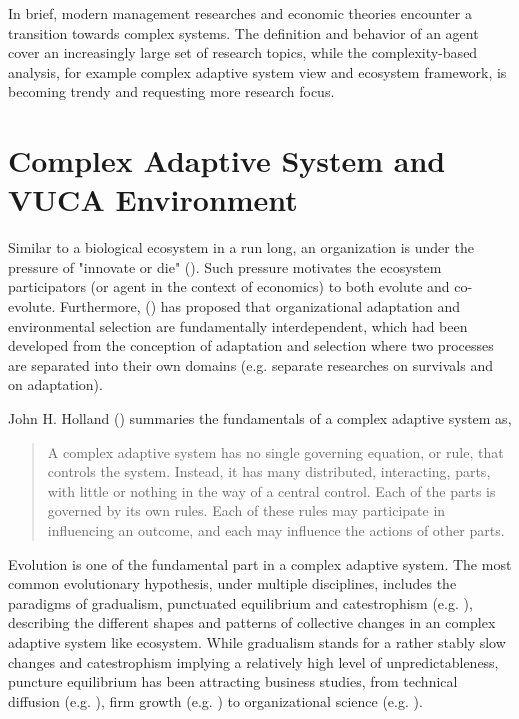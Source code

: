\documentclass[utf8,english]{gradu3}
\begin{document}
In brief, modern management researches and economic theories encounter a transition towards complex systems. The definition and behavior of an agent cover an increasingly large set of research topics, while the complexity-based analysis, for example complex adaptive system view and ecosystem framework, is becoming trendy and requesting more research focus.

\section{Complex Adaptive System and VUCA Environment}

Similar to a biological ecosystem in a run long, an organization is under the pressure of "innovate or die" (\cite{drucker1999knowledge}). Such pressure motivates the ecosystem participators (or agent in the context of economics) to both evolute and co-evolute. Furthermore, \citeauthor{levinthal1991organizational} (\citeyear{levinthal1991organizational}) has proposed that organizational adaptation and environmental selection are fundamentally interdependent, which had been developed from the conception of adaptation and selection where two processes are separated into their own domains (e.g. separate researches on survivals and on adaptation).

John H. Holland (\citeyear{holland1992complex}) summaries the fundamentals of a complex adaptive system as,

\begin{quote}
A complex adaptive system has no single governing equation, or rule, that controls the system. Instead, it has many distributed, interacting, parts, with little or nothing in the way of a central control. Each of the parts is governed by its own rules. Each of these rules may participate in influencing an outcome, and each may influence the actions of other parts.
\end{quote}

Evolution is one of the fundamental part in a complex adaptive system. The most common evolutionary hypothesis, under multiple disciplines, includes the paradigms of gradualism, punctuated equilibrium and catestrophism (e.g. \cite{gould1972punctuated}), describing the different shapes and patterns of collective changes in an complex adaptive system like ecosystem. While gradualism stands for a rather stably slow changes and catestrophism implying a relatively high level of unpredictableness, puncture equilibrium has been attracting business studies, from technical diffusion (e.g. \cite{loch1999punctuated}),  firm growth (e.g. \cite{mudambi2011proactive}) to organizational science (e.g. \cite{romanelli1994organizational}).
\end{document}
